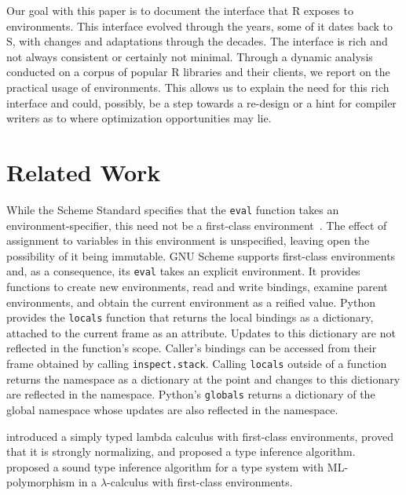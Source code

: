 \documentclass[10pt,review,sigplan,anonymous=true,authorversion=true,nonacm=true]{acmart}
\newcommand{\code}[1]{\lstinline |#1|\xspace}
\begin{document}
Our goal with this paper is to document the interface that R exposes to
environments. This interface evolved through the years, some of it dates back to
S, with changes and adaptations through the decades. The interface is rich and
not always consistent or certainly not minimal. Through a dynamic analysis
conducted on a corpus of popular R libraries and their clients, we report on the
practical usage of environments. This allows us to explain the need for this
rich interface and could, possibly, be a step towards a re-design or a hint for
compiler writers as to where optimization opportunities may lie.

\section{Related Work}

While the Scheme Standard specifies that the \code{eval} function takes an
environment-specifier, this need not be a first-class
environment~\cite{SchemeR5RS}. The effect of assignment to variables in this
environment is unspecified, leaving open the possibility of it being immutable.
GNU Scheme supports first-class environments and, as a consequence, its
\code{eval} takes an explicit environment. It provides functions to create new
environments, read and write bindings, examine parent environments, and obtain
the current environment as a reified value. Python provides the \code{locals}
function that returns the local bindings as a dictionary, attached to the
current frame as an attribute. Updates to this dictionary are not reflected in
the function's scope. Caller's bindings can be accessed from their frame
obtained by calling \code{inspect.stack}. Calling \code{locals} outside of a
function returns the namespace as a dictionary at the point and changes to this
dictionary are reflected in the namespace. Python's \code{globals} returns a
dictionary of the global namespace whose updates are also reflected in the
namespace.

\citet{NishizakiSTLC94} introduced a simply typed lambda calculus with
first-class environments, proved that it is strongly normalizing, and proposed a
type inference algorithm. \citet{NishizakiML94} proposed a sound type inference
algorithm for a type system with ML-polymorphism in a $\lambda$-calculus with
first-class environments.
\end{document}
